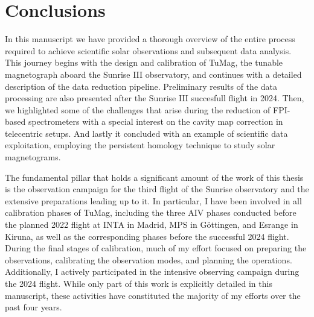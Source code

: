 \chapter{Conclusions}

In this manuscript we have provided a thorough overview of the entire process required to achieve scientific solar observations and subsequent data analysis. This journey begins with the design and calibration of TuMag, the tunable magnetograph aboard the Sunrise III observatory, and continues with a detailed description of the data reduction pipeline. Preliminary results of the data processing are also presented after the Sunrise III succesfull flight in 2024. Then, we highlighted some of the challenges that arise during the reduction of FPI-based spectrometers with a special interest on the cavity map correction in telecentric setups. And lastly it concluded with an example of scientific data exploitation, employing the persistent homology technique to study solar magnetograms.

The fundamental pillar that holds a significant amount of the work of this thesis is the observation campaign for the third flight of the Sunrise observatory and the extensive preparations leading up to it. In particular, I have been involved in all calibration phases of TuMag, including the three AIV phases conducted before the planned 2022 flight at INTA in Madrid, MPS in Göttingen, and Esrange in Kiruna, as well as the corresponding phases before the successful 2024 flight. During the final stages of calibration, much of my effort focused on preparing the observations, calibrating the observation modes, and planning the operations. Additionally, I actively participated in the intensive observing campaign during the 2024 flight. While only part of this work is explicitly detailed in this manuscript, these activities have constituted the majority of my efforts over the past four years.

